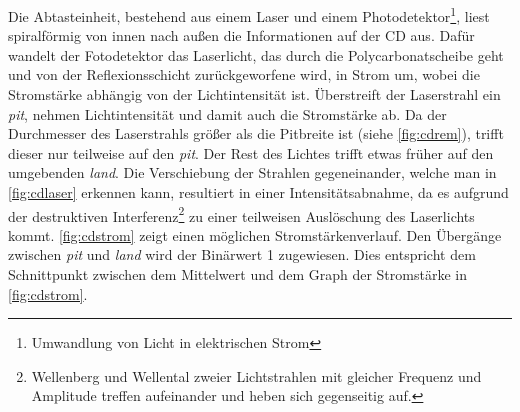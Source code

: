 Die Abtasteinheit, bestehend aus einem Laser und einem
Photodetektor\footnote{Umwandlung von Licht in elektrischen Strom}, liest
spiralförmig von innen nach außen die Informationen auf der CD aus. Dafür
wandelt der Fotodetektor das Laserlicht, das durch die Polycarbonatscheibe geht
und von der Reflexionsschicht zurückgeworfene wird, in Strom um, wobei die
Stromstärke abhängig von der Lichtintensität ist. Überstreift der Laserstrahl
ein \textit{pit}, nehmen Lichtintensität und damit auch die Stromstärke ab. Da
der Durchmesser des Laserstrahls größer als die Pitbreite ist (siehe
\autoref{fig:cdrem}), trifft dieser nur teilweise auf den \textit{pit}. Der Rest
des Lichtes trifft etwas früher auf den umgebenden \textit{land}. Die
Verschiebung der Strahlen gegeneinander, welche man in \autoref{fig:cdlaser}
erkennen kann, resultiert in einer Intensitätsabnahme, da es aufgrund der
destruktiven Interferenz\footnote{Wellenberg und Wellental zweier Lichtstrahlen
mit gleicher Frequenz und Amplitude treffen aufeinander und heben sich
gegenseitig auf.} zu einer teilweisen Auslöschung des Laserlichts kommt.
\autoref{fig:cdstrom} zeigt einen möglichen Stromstärkenverlauf. Den Übergänge
zwischen \textit{pit} und \textit{land} wird der Binärwert 1 zugewiesen. Dies
entspricht dem Schnittpunkt zwischen dem Mittelwert und dem Graph der
Stromstärke in \autoref{fig:cdstrom}. \cite{cdp}

